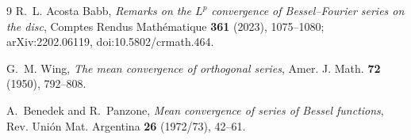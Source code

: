 \documentclass[11pt]{article}
\begin{document}
\begin{thebibliography}{9}
R.~L. Acosta Babb,
\emph{Remarks on the $L^p$ convergence of Bessel--Fourier series on the disc},
Comptes Rendus Math\'ematique \textbf{361} (2023), 1075--1080;
arXiv:2202.06119, doi:10.5802/crmath.464.

G.~M. Wing,
\emph{The mean convergence of orthogonal series},
Amer. J. Math. \textbf{72} (1950), 792--808.

A.~Benedek and R.~Panzone,
\emph{Mean convergence of series of Bessel functions},
Rev. Uni\'on Mat. Argentina \textbf{26} (1972/73), 42--61.
\end{thebibliography}
\end{document}
